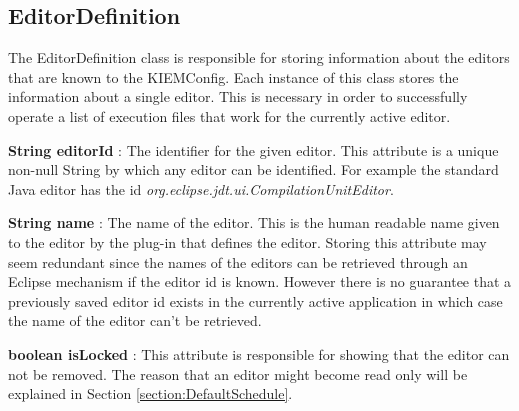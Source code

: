 \subsection{EditorDefinition}
\label{section:EditorDefinition}
The EditorDefinition class is responsible for storing information about the editors that are known to
the \ac{KIEMConfig}. Each instance of this class stores the information about a single editor. This is
necessary in order to successfully operate a list of execution files that work for the currently active
editor.
\begin{description}
 \item \textbf{String editorId} : The identifier for the given editor. This attribute is a unique non-null String
by which any editor can be identified. For example the standard Java editor has the id \textit{org.eclipse.jdt.ui.CompilationUnitEditor}.
 \item \textbf{String name} : The name of the editor. This is the human readable name given to the editor
by the plug-in that defines the editor. Storing this attribute may seem redundant since the names of
the editors can be retrieved through an Eclipse mechanism if the editor id is known. However there is no
guarantee that a previously saved editor id exists in the currently active application in which case the name
of the editor can't be retrieved.
 \item \textbf{boolean isLocked} : This attribute is responsible for showing that the editor can not be removed.
The reason that an editor might become read only will be explained in Section \ref{section:DefaultSchedule}.
\end{description}

